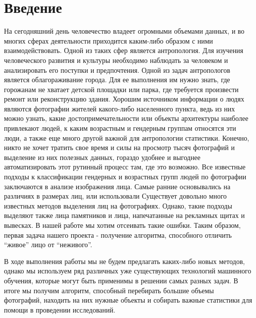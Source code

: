 \documentclass[a4paper,14pt]{extarticle}
\begin{document}
    \section{Введение}

    На сегодняшний день человечество владеет огромными объемами данных, и во многих сферах деятельности приходится каким-либо образом с ними взаимодействовать. Одной из таких сфер является антропология. Для изучения человеческого развития и культуры необходимо наблюдать за человеком и анализировать его поступки и предпочтения. Одной из задач антропологов является облагораживание города. Для ее выполнения им нужно знать, где горожанам не хватает детской площадки или парка, где требуется произвести ремонт или реконструкцию здания. Хорошим источником информации о людях являются фотографии жителей какого-либо населенного пункта, ведь из них можно узнать, какие достопримечательности или объекты архитектуры наиболее привлекают людей, к каким возрастным и гендерным группам относятся эти люди, а также еще много другой важной для антропологии статистики. Конечно, никто не хочет тратить свое время и силы на просмотр тысяч фотографий и выделение из них полезных данных, гораздо удобнее и выгоднее автоматизировать этот рутинный процесс там, где это возможно.
    Все известные подходы к классификации гендерных и возрастных групп людей по фотографии заключаются в анализе изображения лица. Самые ранние основывались на различиях в размерах лиц, или использовали
    Существует довольно много известных методов выделения лиц на фотографиях. Однако, такие подходы выделяют также лица памятников и лица, напечатанные на рекламных щитах и вывесках. В нашей работе мы хотим отсеивать такие ошибки. Таким образом, первая задача нашего проекта - получение алгоритма, способного отличить “живое” лицо от “неживого”.

    В ходе выполнения работы мы не будем предлагать каких-либо новых методов, однако мы используем ряд различных уже существующих технологий машинного обучения, которые могут быть применимы в решении самых разных задач. В итоге мы получим алгоритм, способный перебирать большие объемы фотографий, находить на них нужные объекты и собирать важные статистики для помощи в проведении исследований.
    \newpage
\end{document}
